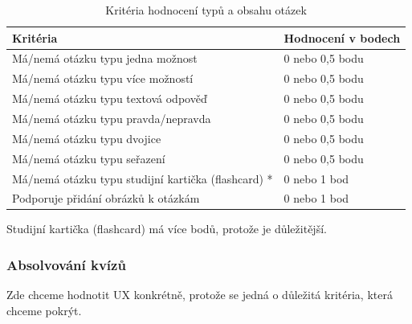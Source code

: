 \documentclass{vskpou} %
\begin{document}
\begin{table}[H]
\caption{Kritéria hodnocení typů a obsahu otázek}
\label{tab:typologie}
\centering
\begin{threeparttable}
\begin{tabular}{|p{}|l|}
\hline
\textbf{Kritéria} & \textbf{Hodnocení v bodech} \\ \hline
Má/nemá otázku typu jedna možnost & 0 nebo 0,5 bodu \\ \hline
Má/nemá otázku typu více možností & 0 nebo 0,5 bodu \\ \hline
Má/nemá otázku typu textová odpověď & 0 nebo 0,5 bodu \\ \hline
Má/nemá otázku typu pravda/nepravda & 0 nebo 0,5 bodu \\ \hline
Má/nemá otázku typu dvojice & 0 nebo 0,5 bodu \\ \hline
Má/nemá otázku typu seřazení & 0 nebo 0,5 bodu \\ \hline
Má/nemá otázku typu studijní kartička (flashcard) * & 0 nebo 1 bod \\ \hline
Podporuje přidání obrázků k otázkám & 0 nebo 1 bod \\ \hline
\end{tabular}
\begin{tablenotes}[flushleft]
\footnotesize
\item[*] Studijní kartička (flashcard) má více bodů, protože je důležitější.
\end{tablenotes}
\end{threeparttable}
\end{table}

\subsubsection{Absolvování kvízů}

Zde chceme hodnotit UX konkrétně, protože se jedná o důležitá kritéria, která chceme pokrýt.
\end{document}
